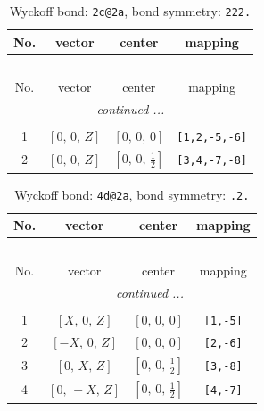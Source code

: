 \documentclass[fleqn,8pt]{jsarticle}
\begin{document}
\renewcommand{\arraystretch}{1.2}
\begin{longtable}{cccc}
\caption{Wyckoff bond: {\tt 2c@2a}, bond symmetry: {\tt 222.}}
 \\
 \hline \hline
No. & vector & center & mapping \\ \hline \endfirsthead

\multicolumn{3}{l}{\tablename\ \thetable{}} \\
 \hline \hline
No. & vector & center & mapping \\ \hline \endhead

 \hline \hline
\multicolumn{3}{r}{\footnotesize\it continued ...} \\ \endfoot

 \hline \hline
\multicolumn{3}{r}{} \\ \endlastfoot

1 & $\left[ 0,\, 0,\, Z \right]$ & $\left[ 0,\, 0,\, 0 \right]$ & {\tt [1,2,-5,-6]} \\ \hline
2 & $\left[ 0,\, 0,\, Z \right]$ & $\left[ 0,\, 0,\, \frac{1}{2} \right]$ & {\tt [3,4,-7,-8]} \\
\end{longtable}
\renewcommand{\arraystretch}{1.2}
\begin{longtable}{cccc}
\caption{Wyckoff bond: {\tt 4d@2a}, bond symmetry: {\tt .2.}}
 \\
 \hline \hline
No. & vector & center & mapping \\ \hline \endfirsthead

\multicolumn{3}{l}{\tablename\ \thetable{}} \\
 \hline \hline
No. & vector & center & mapping \\ \hline \endhead

 \hline \hline
\multicolumn{3}{r}{\footnotesize\it continued ...} \\ \endfoot

 \hline \hline
\multicolumn{3}{r}{} \\ \endlastfoot

1 & $\left[ X,\, 0,\, Z \right]$ & $\left[ 0,\, 0,\, 0 \right]$ & {\tt [1,-5]} \\ \hline
2 & $\left[ - X,\, 0,\, Z \right]$ & $\left[ 0,\, 0,\, 0 \right]$ & {\tt [2,-6]} \\ \hline
3 & $\left[ 0,\, X,\, Z \right]$ & $\left[ 0,\, 0,\, \frac{1}{2} \right]$ & {\tt [3,-8]} \\ \hline
4 & $\left[ 0,\, - X,\, Z \right]$ & $\left[ 0,\, 0,\, \frac{1}{2} \right]$ & {\tt [4,-7]} \\
\end{longtable}
\end{document}
